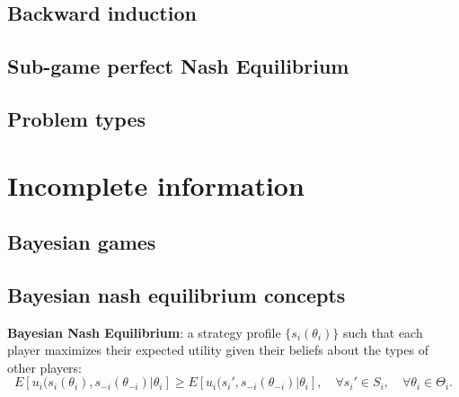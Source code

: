 \documentclass{article}
\begin{document}
\subsection{Backward induction}

\subsection{Sub-game perfect Nash Equilibrium}

\subsection{Problem types}


\section{Incomplete information}\label{II}

\subsection{Bayesian games}\label{bayes}

\subsection{Bayesian nash equilibrium concepts}\label{WPBNE}

\textbf{Bayesian Nash Equilibrium}: a strategy profile \(\{s_i(\theta_i)\}\) such that each player maximizes their expected utility given their beliefs about the types of other players:
\[
E[u_i(s_i(\theta_i), s_{-i}(\theta_{-i}) | \theta_i] \geq E[u_i(s_i', s_{-i}(\theta_{-i}) | \theta_i], \quad \forall s_i' \in S_i, \quad \forall \theta_i \in \Theta_i.
\]
\end{document}
